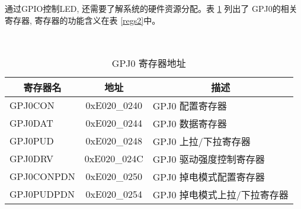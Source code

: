 通过GPIO控制LED, 还需要了解系统的硬件资源分配。表 \ref{regs1} 列出了
GPJ0的相关寄存器, 寄存器的功能含义在表 \ref{regs2}中。
	
\begin{table}[!ht]
\centering
\caption{GPJ0 寄存器地址}\label{regs1} \ \\

\begin{tabular}{|l|c|l|}
\hline
\multicolumn{1}{|c|}{寄存器名} & 地址 & 
\multicolumn{1}{c|}{描述} \\\hline
	GPJ0CON   & 0xE020\_0240 & GPJ0 配置寄存器              \\\hline
	GPJ0DAT   & 0xE020\_0244 & GPJ0 数据寄存器              \\\hline
	GPJ0PUD   & 0xE020\_0248 & GPJ0 上拉/下拉寄存器         \\\hline
	GPJ0DRV   & 0xE020\_024C & GPJ0 驱动强度控制寄存器      \\\hline
	GPJ0CONPDN& 0xE020\_0250 & GPJ0 掉电模式配置寄存器      \\\hline
	GPJ0PUDPDN& 0xE020\_0254 & GPJ0 掉电模式上拉/下拉寄存器 \\\hline
\end{tabular}
\end{table}


